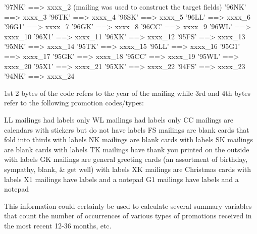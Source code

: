 \documentclass[
  11pt,
  a4paper,
  DIV=12,captions=tableheading,oneside,titlepage]{scrbook}
\let\oldverbatim\verbatim
\let\endoldverbatim\endverbatim
\renewenvironment{verbatim}{\footnotesize\oldverbatim}{\endoldverbatim}
\begin{document}
\begin{verbatim}
                            '97NK' ==> xxxx_2 (mailing was used to construct 
                                               the target fields)
                            '96NK' ==> xxxx_3
                            '96TK' ==> xxxx_4
                            '96SK' ==> xxxx_5
                            '96LL' ==> xxxx_6
                            '96G1' ==> xxxx_7
                            '96GK' ==> xxxx_8
                            '96CC' ==> xxxx_9
                            '96WL' ==> xxxx_10
                            '96X1' ==> xxxx_11
                            '96XK' ==> xxxx_12
                            '95FS' ==> xxxx_13
                            '95NK' ==> xxxx_14
                            '95TK' ==> xxxx_15
                            '95LL' ==> xxxx_16
                            '95G1' ==> xxxx_17
                            '95GK' ==> xxxx_18
                            '95CC' ==> xxxx_19
                            '95WL' ==> xxxx_20
                            '95X1' ==> xxxx_21
                            '95XK' ==> xxxx_22
                            '94FS' ==> xxxx_23
                            '94NK' ==> xxxx_24

                            1st 2 bytes of the code refers to the year of the 
                            mailing while 3rd and 4th bytes refer to the 
                            following promotion codes/types: 

                            LL mailings had labels only
                            WL mailings had labels only
                            CC mailings are calendars with stickers but do
                               not have labels
                            FS mailings are blank cards that fold into
                               thirds with labels
                            NK mailings are blank cards with labels
                            SK mailings are blank cards with labels
                            TK mailings have thank you printed on the
                               outside with labels
                            GK mailings are general greeting cards (an
                               assortment of birthday, sympathy, blank, & get
                               well) with labels
                            XK mailings are Christmas cards with labels
                            X1 mailings have labels and a notepad
                            G1 mailings have labels and a notepad
                            
                            This information could certainly be used to calculate 
                            several summary variables that count the number of 
                            occurrences of various types of promotions received 
                            in the most recent 12-36 months, etc. 


\end{verbatim}
\end{document}

